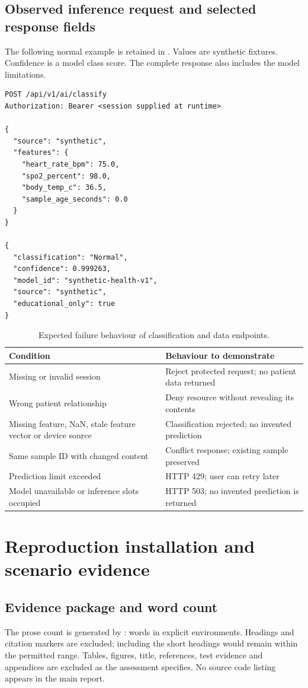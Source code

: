 \subsection{Observed inference request and selected response fields}
The following normal example is retained in . Values are synthetic fixtures. Confidence is a model class score. The complete response also includes the model limitations.
\begin{lstlisting}
POST /api/v1/ai/classify
Authorization: Bearer <session supplied at runtime>

{
  "source": "synthetic",
  "features": {
    "heart_rate_bpm": 75.0,
    "spo2_percent": 98.0,
    "body_temp_c": 36.5,
    "sample_age_seconds": 0.0
  }
}

{
  "classification": "Normal",
  "confidence": 0.999263,
  "model_id": "synthetic-health-v1",
  "source": "synthetic",
  "educational_only": true
}
\end{lstlisting}

\begin{table}[H]\small
\caption{Expected failure behaviour of classification and data endpoints.}
\begin{tabularx}{\textwidth}{@{}P{34mm}Y@{}}\toprule
Condition & Behaviour to demonstrate\\\midrule
Missing or invalid session & Reject protected request; no patient data returned\\
Wrong patient relationship & Deny resource without revealing its contents\\
Missing feature, NaN, stale feature vector or device source & Classification rejected; no invented prediction\\
Same sample ID with changed content & Conflict response; existing sample preserved\\
Prediction limit exceeded & HTTP 429; user can retry later\\
Model unavailable or inference slots occupied & HTTP 503; no invented prediction is returned\\\bottomrule
\end{tabularx}
\end{table}
\FloatBarrier

\section{Reproduction installation and scenario evidence}
\label{app:repro}
\subsection{Evidence package and word count}
The prose count is generated by : \MainWordCount{} words in explicit  environments. Headings and citation markers are excluded; including the short headings would remain within the permitted range. Tables, figures, title, references, test evidence and appendices are excluded as the assessment specifies. No source code listing appears in the main report.

